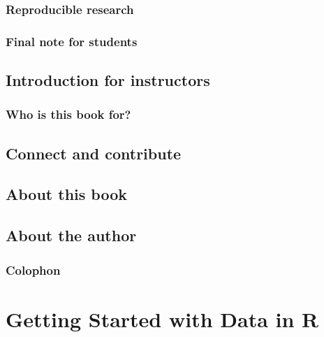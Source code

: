 \documentclass[12pt, krantz2,]{krantz}
\begin{document}
\hypertarget{subsec:reproducible}{%
\subsection{Reproducible research}\label{subsec:reproducible}}

\hypertarget{final-note-for-students}{%
\subsection{Final note for students}\label{final-note-for-students}}

\hypertarget{sec:intro-instructors}{%
\section{Introduction for instructors}\label{sec:intro-instructors}}

\hypertarget{who-is-this-book-for}{%
\subsection{Who is this book for?}\label{who-is-this-book-for}}

\hypertarget{sec:connect-contribute}{%
\section{Connect and contribute}\label{sec:connect-contribute}}

\hypertarget{sec:about-book}{%
\section{About this book}\label{sec:about-book}}

\hypertarget{sec:about-authors}{%
\section{About the author}\label{sec:about-authors}}

\hypertarget{colophon}{%
\subsection{Colophon}\label{colophon}}

\hypertarget{getting-started}{%
\chapter{Getting Started with Data in R}\label{getting-started}}
\end{document}
